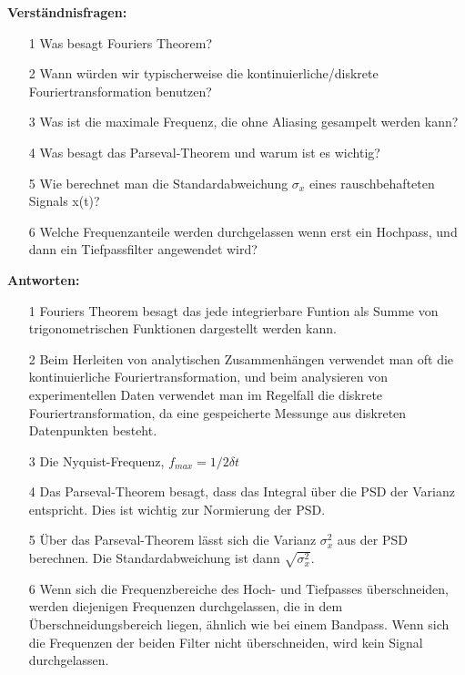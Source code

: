 \newpage

\begin{tcolorbox}[enhanced,width=6in,
    fontupper=\small,drop fuzzy shadow southwest,
    colframe=black!50!black,colback=black!5]
\textbf{Verständnisfragen:} \\
\begin{enumerate}
\item[1] Was besagt Fouriers Theorem?
\item[2] Wann würden wir typischerweise die kontinuierliche/diskrete Fouriertransformation benutzen?
\item[3] Was ist die maximale Frequenz, die ohne Aliasing gesampelt werden kann?
\item[4] Was besagt das Parseval-Theorem und warum ist es wichtig? 
\item[5] Wie berechnet man die Standardabweichung $\sigma_x$ eines rauschbehafteten Signals x(t)?
\item[6] Welche Frequenzanteile werden durchgelassen wenn erst ein Hochpass, und dann ein Tiefpassfilter angewendet wird? 
\end{enumerate}
\end{tcolorbox}

\begin{tcolorbox}[enhanced,width=6in,
    fontupper=\small,drop fuzzy shadow southwest,
    colframe=black!50!black,colback=black!5]
\textbf{Antworten:} \\
\begin{enumerate}
\item[1] Fouriers Theorem besagt das jede integrierbare Funtion als Summe von trigonometrischen Funktionen dargestellt werden kann. 
\item[2] Beim Herleiten von analytischen Zusammenhängen verwendet man oft die kontinuierliche Fouriertransformation, und beim analysieren von experimentellen Daten verwendet man im Regelfall die diskrete Fouriertransformation, da eine gespeicherte Messunge aus diskreten Datenpunkten besteht.  
\item[3] Die Nyquist-Frequenz, $f_{max} = 1/2\delta t$
\item[4] Das Parseval-Theorem besagt, dass das Integral über die PSD der Varianz entspricht. Dies ist wichtig zur Normierung der PSD. 
\item[5] Über das Parseval-Theorem lässt sich die Varianz $\sigma_x^2$ aus der PSD berechnen. Die Standardabweichung ist dann $\sqrt{\sigma_x^2}$. 
\item[6] Wenn sich die Frequenzbereiche des Hoch- und Tiefpasses überschneiden, werden diejenigen Frequenzen durchgelassen, die in dem Überschneidungsbereich liegen, ähnlich wie bei einem Bandpass. Wenn sich die Frequenzen der beiden Filter nicht überschneiden, wird kein Signal durchgelassen. 
\end{enumerate}
\end{tcolorbox}